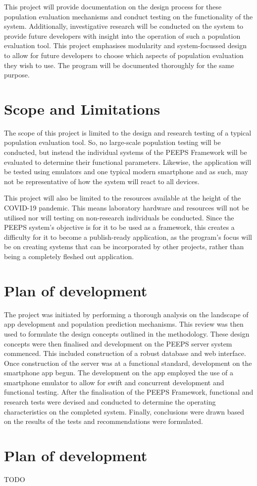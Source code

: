 This project will provide documentation on the design process for these population evaluation mechanisms and conduct testing on the functionality of the system. Additionally, investigative research will be conducted on the system to provide future developers with insight into the operation of such a population evaluation tool. 
This project emphasises modularity and system-focussed design to allow for future developers to choose which aspects of population evaluation they wish to use. The program will be documented thoroughly for the same purpose.


\section{Scope and Limitations}
The scope of this project is limited to the design and research testing of a typical population evaluation tool. So, no large-scale population testing will be conducted, but instead the individual systems of the PEEPS Framework will be evaluated to determine their functional parameters. Likewise, the application will be tested using emulators and one typical modern smartphone and as such, may not be representative of how the system will react to all devices. 

This project will also be limited to the resources available at the height of the COVID-19 pandemic. This means laboratory hardware and resources will not be utilised nor will testing on non-research individuals be conducted.
Since the PEEPS system’s objective is for it to be used as a framework, this creates a difficulty for it to become a publish-ready application, as the program’s focus will be on creating systems that can be incorporated by other projects, rather than being a completely fleshed out application.


\section{Plan of development}
The project was initiated by performing a thorough analysis on the landscape of app development and population prediction mechanisms. This review was then used to formulate the design concepts outlined in the methodology. These design concepts were then finalised and development on the PEEPS server system commenced. This included construction of a robust database and web interface. Once construction of the server was at a functional standard, development on the smartphone app begun. The development on the app employed the use of a smartphone emulator to allow for swift and concurrent development and functional testing. After the finalisation of the PEEPS Framework, functional and research tests were devised and conducted to determine the operating characteristics on the completed system. Finally, conclusions were drawn based on the results of the tests and recommendations were formulated.

\section{Plan of development}
TODO
